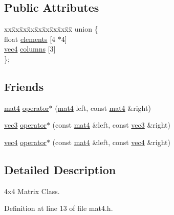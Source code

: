 \subsection*{Public Attributes}
\begin{DoxyCompactItemize}
\item 
\begin{tabbing}
xx\=xx\=xx\=xx\=xx\=xx\=xx\=xx\=xx\=\kill
union \{\\
\>float \hyperlink{structspork_1_1maths_1_1mat4_a0a8a151f19ba28db2930db1931d304ae}{elements} \mbox{[}4 $\ast$4\mbox{]}\\
\>\hyperlink{structspork_1_1maths_1_1vec4}{vec4} \hyperlink{structspork_1_1maths_1_1mat4_abf628a07e5dbd841155b941a1c157acf}{columns} \mbox{[}3\mbox{]}\\
\}; \\

\end{tabbing}\end{DoxyCompactItemize}
\subsection*{Friends}
\begin{DoxyCompactItemize}
\item 
\hyperlink{structspork_1_1maths_1_1mat4}{mat4} \hyperlink{structspork_1_1maths_1_1mat4_aec96623f8535f2451a1cfef2b9f56e29}{operator$\ast$} (\hyperlink{structspork_1_1maths_1_1mat4}{mat4} left, const \hyperlink{structspork_1_1maths_1_1mat4}{mat4} \&right)
\item 
\hyperlink{structspork_1_1maths_1_1vec3}{vec3} \hyperlink{structspork_1_1maths_1_1mat4_a4d8d620a16d3104dc5c96435d0d12530}{operator$\ast$} (const \hyperlink{structspork_1_1maths_1_1mat4}{mat4} \&left, const \hyperlink{structspork_1_1maths_1_1vec3}{vec3} \&right)
\item 
\hyperlink{structspork_1_1maths_1_1vec4}{vec4} \hyperlink{structspork_1_1maths_1_1mat4_aa9a6ff23e02db1be9e45e89037029a1b}{operator$\ast$} (const \hyperlink{structspork_1_1maths_1_1mat4}{mat4} \&left, const \hyperlink{structspork_1_1maths_1_1vec4}{vec4} \&right)
\end{DoxyCompactItemize}


\subsection{Detailed Description}
4x4 Matrix Class. 

Definition at line 13 of file mat4.\+h.



